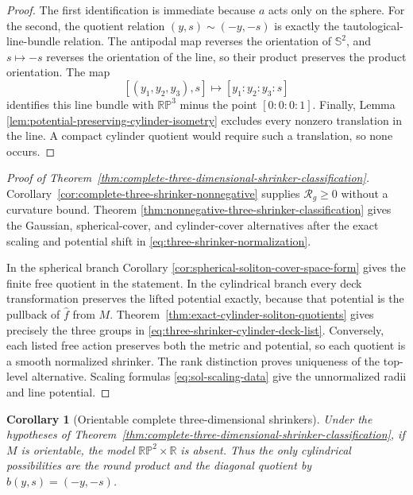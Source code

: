 \documentclass[10pt]{coll-l}
\newcommand{\R}{\mathbb{R}}
\newcommand{\Sph}{\mathbb{S}}
\newtheorem{corollary}[theorem]{Corollary}
\theoremstyle{definition}
\theoremstyle{remark}
\numberwithin{section}{chapter}
\numberwithin{equation}{chapter}
\begin{document}
\begin{proof}
The first identification is immediate because $a$ acts only on the sphere.
For the second, the quotient relation $(y,s)\sim(-y,-s)$ is exactly the
tautological-line-bundle relation.  The antipodal map reverses the
orientation of $\Sph^2$, and $s\mapsto-s$ reverses the orientation of the
line, so their product preserves the product orientation.  The map
\[
   [(y_1,y_2,y_3),s]\longmapsto[y_1:y_2:y_3:s]
\]
identifies this line bundle with $\mathbb{RP}^3$ minus the point
$[0:0:0:1]$.  Finally, Lemma
\ref{lem:potential-preserving-cylinder-isometry} excludes every nonzero
translation in the line.  A compact cylinder quotient would require such a
translation, so none occurs.
\end{proof}

\begin{proof}[Proof of Theorem~\ref{thm:complete-three-dimensional-shrinker-classification}]
Corollary~\ref{cor:complete-three-shrinker-nonnegative} supplies
$\mathcal R_g\geq0$ without a curvature bound.  Theorem
\ref{thm:nonnegative-three-shrinker-classification} gives the Gaussian,
spherical-cover, and cylinder-cover alternatives after the exact scaling
and potential shift in \eqref{eq:three-shrinker-normalization}.

In the spherical branch Corollary
\ref{cor:spherical-soliton-cover-space-form} gives the finite free quotient
in the statement.  In the cylindrical
branch every deck transformation preserves the lifted potential exactly,
because that potential is the pullback of $\widehat f$ from $M$.
Theorem~\ref{thm:exact-cylinder-soliton-quotients} gives precisely the three
groups in \eqref{eq:three-shrinker-cylinder-deck-list}.  Conversely, each
listed free action preserves both the metric and potential, so each quotient
is a smooth normalized shrinker.  The rank distinction proves uniqueness of
the top-level alternative.  Scaling formulas
\eqref{eq:sol-scaling-data} give the unnormalized radii and line potential.
\end{proof}

\begin{corollary}[Orientable complete three-dimensional shrinkers]
\label{cor:orientable-three-shrinker-classification}
Under the hypotheses of
Theorem~\ref{thm:complete-three-dimensional-shrinker-classification}, if
$M$ is orientable, the model $\mathbb{RP}^2\times\R$ is absent.  Thus the
only cylindrical possibilities are the round product and the diagonal
quotient by $b(y,s)=(-y,-s)$.
\end{corollary}
\end{document}
